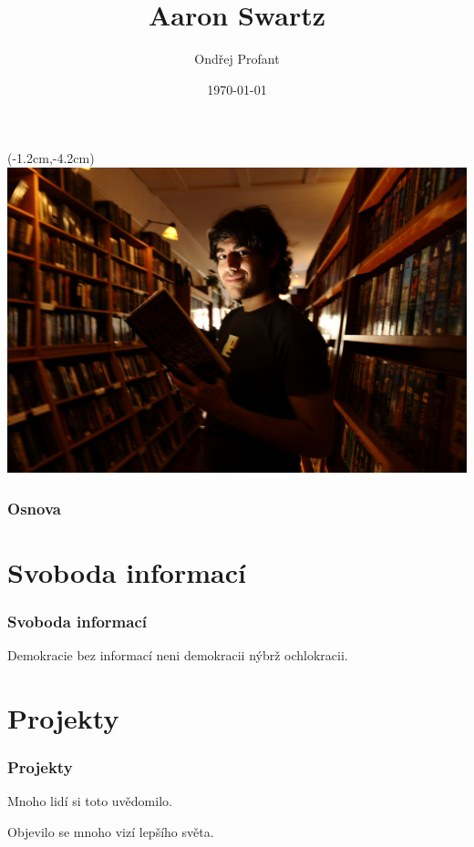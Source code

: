 \documentclass[xetex]{beamer}
\title{Aaron Swartz}
\author{Ondřej Profant}
\institute[Piráti]{Česká pirátská strana}
\date{\today}
\begin{document}
\begin{frame}
  \begin{textblock*}{0cm}(-1.2cm,-4.2cm)
  \includegraphics[scale=1.2]{images/intro.jpg}
  \end{textblock*}
\end{frame}

\begin{frame}
  \titlepage
\end{frame}

\begin{frame}
  \frametitle{Osnova}
  \tableofcontents
\end{frame}	


\section{Svoboda informací}
\begin{frame}
	\frametitle{Svoboda informací}
	Demokracie bez informací neni demokracii nýbrž ochlokracii.
\end{frame}

\section{Projekty}
\begin{frame}
	\frametitle{Projekty}
	Mnoho lidí si toto uvědomilo. 

	\medskip

	Objevilo se mnoho vizí lepšího světa.
\end{frame}
\end{document}
